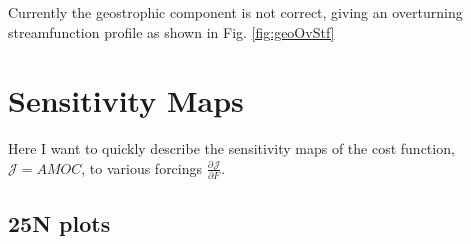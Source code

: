 \documentclass[a4paper,11pt]{article}
\newcommand{\pderiv}[3][]{%
  \ensuremath{\frac{\partial^{#1} {#2}}{\partial {#3}^{#1}}}}
\begin{document}
    Currently the geostrophic component is not correct, giving an overturning streamfunction profile as shown in Fig. \ref{fig:geoOvStf}
    

   



 \section{Sensitivity Maps}

  Here I want to quickly describe the sensitivity maps of the cost function, $\mathcal{J} = AMOC$, to various forcings $\pderiv{\mathcal{J}}{F}$. 

    \subsection{25N plots}
\end{document}
